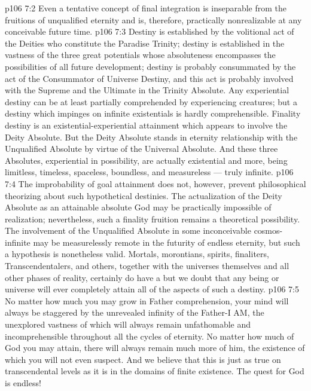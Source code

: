 \vs p106 7:2 Even a tentative concept of final integration is inseparable from the fruitions of unqualified eternity and is, therefore, practically nonrealizable at any conceivable future time.
\vs p106 7:3 \pc Destiny is established by the volitional act of the Deities who constitute the Paradise Trinity; destiny is established in the vastness of the three great potentials whose absoluteness encompasses the possibilities of all future development; destiny is probably consummated by the act of the Consummator of Universe Destiny, and this act is probably involved with the Supreme and the Ultimate in the Trinity Absolute. Any experiential destiny can be at least partially comprehended by experiencing creatures; but a destiny which impinges on infinite existentials is hardly comprehensible. Finality destiny is an existential\hyp{}experiential attainment which appears to involve the Deity Absolute. But the Deity Absolute stands in eternity relationship with the Unqualified Absolute by virtue of the Universal Absolute. And these three Absolutes, experiential in possibility, are actually existential and more, being limitless, timeless, spaceless, boundless, and measureless --- truly infinite.
\vs p106 7:4 The improbability of goal attainment does not, however, prevent philosophical theorizing about such hypothetical destinies. The actualization of the Deity Absolute as an attainable absolute God may be practically impossible of realization; nevertheless, such a finality fruition remains a theoretical possibility. The involvement of the Unqualified Absolute in some inconceivable cosmos\hyp{}infinite may be measurelessly remote in the futurity of endless eternity, but such a hypothesis is nonetheless valid. Mortals, morontians, spirits, finaliters, Transcendentalers, and others, together with the universes themselves and all other phases of reality, certainly do have a  but we doubt that any being or universe will ever completely attain all of the aspects of such a destiny.
\vs p106 7:5 \pc No matter how much you may grow in Father comprehension, your mind will always be staggered by the unrevealed infinity of the Father\hyp{}I AM, the unexplored vastness of which will always remain unfathomable and incomprehensible throughout all the cycles of eternity. No matter how much of God you may attain, there will always remain much more of him, the existence of which you will not even suspect. And we believe that this is just as true on transcendental levels as it is in the domains of finite existence. The quest for God is endless!
